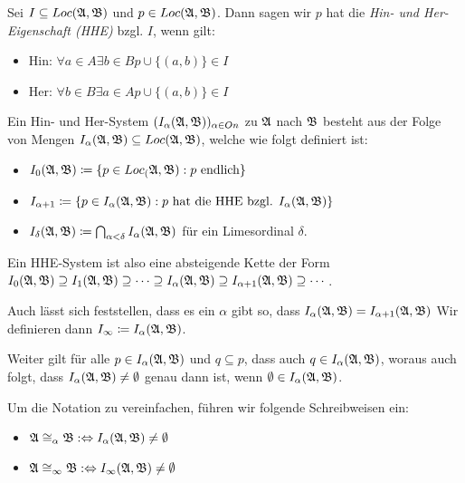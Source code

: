 \begin{definition}
	Sei $I\subseteq Loc(\mathfrak{A},\mathfrak{B})$ und $p\in Loc(\mathfrak{A},\mathfrak{B})$. Dann sagen wir $p$ hat die \textit{Hin- und Her- Eigenschaft (HHE)} bzgl. $I$, wenn gilt:
	\begin{itemize}
		\item Hin: $\forall a\in A \exists b\in B p\cup\{(a,b)\}\in I$
		\item Her: $\forall b\in B\exists a\in A p\cup\{(a,b)\}\in I$
	\end{itemize}
\end{definition}
\begin{definition}
	Ein Hin- und Her-System $(I_\alpha(\mathfrak{A},\mathfrak{B}))_{\alpha\in On}$ zu $\mathfrak{A}$ nach $\mathfrak{B}$ besteht aus der Folge von Mengen $I_\alpha(\mathfrak{A},\mathfrak{B})\subseteq Loc(\mathfrak{A},\mathfrak{B})$, welche wie folgt definiert ist:
	\begin{itemize}
		\item $I_0(\mathfrak{A},\mathfrak{B})\coloneqq\{p\in Loc_(\mathfrak{A},\mathfrak{B}): p \text{ endlich}\}$
		\item $I_{\alpha+1}\coloneqq\{p\in I_\alpha(\mathfrak{A},\mathfrak{B}) : p \text{ hat die HHE bzgl. } I_\alpha(\mathfrak{A},\mathfrak{B})\}$
		\item $I_\delta(\mathfrak{A},\mathfrak{B})\coloneqq \bigcap_{\alpha<\delta}I_\alpha(\mathfrak{A},\mathfrak{B})$ für ein Limesordinal $\delta$.
	\end{itemize}
\end{definition}

Ein HHE-System ist also eine absteigende Kette der Form $I_0(\mathfrak{A},\mathfrak{B})\supseteq I_1(\mathfrak{A},\mathfrak{B}) \supseteq \cdots \supseteq I_\alpha(\mathfrak{A},\mathfrak{B}) \supseteq I_{\alpha+1}(\mathfrak{A},\mathfrak{B})\supseteq \cdots$.

Auch lässt sich feststellen, dass es ein $\alpha$ gibt so, dass $I_\alpha(\mathfrak{A},\mathfrak{B})=I_{\alpha+1}(\mathfrak{A},\mathfrak{B})$ Wir definieren dann $I_\infty\coloneqq I_\alpha(\mathfrak{A},\mathfrak{B})$.

Weiter gilt für alle $p\in I_\alpha(\mathfrak{A},\mathfrak{B})$ und $q\subseteq p$, dass auch $q\in I_\alpha(\mathfrak{A},\mathfrak{B})$, woraus auch folgt, dass $I_\alpha(\mathfrak{A},\mathfrak{B})\neq\emptyset$ genau dann ist, wenn $\emptyset\in I_\alpha(\mathfrak{A},\mathfrak{B})$.

\begin{definition}
	Um die Notation zu vereinfachen, führen wir folgende Schreibweisen ein:
	\begin{itemize}
		\item $\mathfrak{A}\cong_\alpha\mathfrak{B} :\Leftrightarrow I_\alpha(\mathfrak{A},\mathfrak{B})\neq\emptyset$
		\item $\mathfrak{A}\cong_\infty\mathfrak{B} :\Leftrightarrow I_\infty(\mathfrak{A},\mathfrak{B})\neq \emptyset$
	\end{itemize}
\end{definition}

